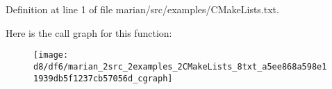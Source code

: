Definition at line 1 of file marian/src/examples/\+C\+Make\+Lists.\+txt.




Here is the call graph for this function\+:
\nopagebreak
\begin{figure}[H]
\begin{center}
\leavevmode
\texttt{[image: d8/df6/marian\_2src\_2examples\_2CMakeLists\_8txt\_a5ee868a598e11939db5f1237cb57056d\_cgraph]}
\end{center}
\end{figure}



